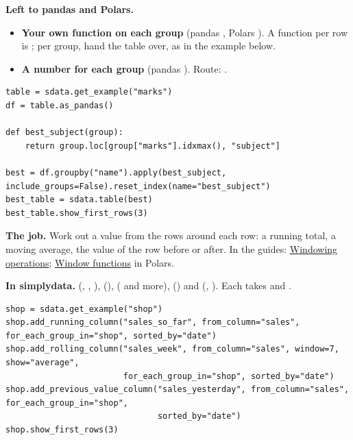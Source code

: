 \textbf{Left to pandas and Polars.}
\begin{itemize}
  \item \textbf{Your own function on each group} (pandas , Polars
    ). A function per row is ; per group, hand
    the table over, as in the example below.
  \item \textbf{A number for each group} (pandas ). Route:
    .
\end{itemize}

\begin{lstlisting}[style=py]
table = sdata.get_example("marks")
df = table.as_pandas()

def best_subject(group):
    return group.loc[group["marks"].idxmax(), "subject"]

best = df.groupby("name").apply(best_subject, include_groups=False).reset_index(name="best_subject")
best_table = sdata.table(best)
best_table.show_first_rows(3)
\end{lstlisting}


\textbf{The job.} Work out a value from the rows around each row: a running total, a moving average,
the value of the row before or after. In the guides:
\href{https://pandas.pydata.org/docs/user_guide/window.html}{Windowing operations};
\href{https://docs.pola.rs/user-guide/expressions/window-functions/}{Window functions} in Polars.

\textbf{In simplydata.}  (, ,
),  (), 
( and more),  () and 
(, ). Each takes  and .

\begin{lstlisting}[style=py]
shop = sdata.get_example("shop")
shop.add_running_column("sales_so_far", from_column="sales", for_each_group_in="shop", sorted_by="date")
shop.add_rolling_column("sales_week", from_column="sales", window=7, show="average",
                        for_each_group_in="shop", sorted_by="date")
shop.add_previous_value_column("sales_yesterday", from_column="sales", for_each_group_in="shop",
                               sorted_by="date")
shop.show_first_rows(3)
\end{lstlisting}

